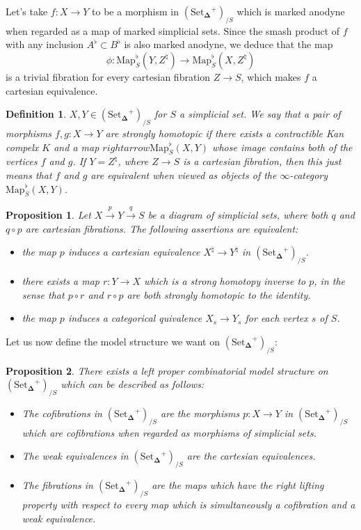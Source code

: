 \documentclass{amsart}
\newcommand{\8}{\ensuremath{\infty}}
\newcommand{\SSet}{\ensuremath{\text{Set}_{\boldsymbol{\Delta}}}}
\newcommand{\Map}{\ensuremath{\text{Map}}}
\newtheorem{definition}{Definition}
\newtheorem{proposition}{Proposition}
\begin{document}
Let's take $f:X\rightarrow Y$ to be a morphism in $(\SSet^+)_{/S}$ which is marked anodyne when regarded as a map of marked simplicial sets. Since the smash product of $f$ with any inclusion $A^\flat\subset B^\flat$ is also marked anodyne, we deduce that the map \[\phi:\Map_S^\flat(Y,Z^\natural)\rightarrow \Map_S^\flat(X,Z^\natural)\] is a trivial fibration for every cartesian fibration $Z\rightarrow S$, which makes $f$ a cartesian equivalence.

\begin{definition}
  $X,Y\in(\SSet^+)_{/S}$ for $S$ a simplicial set. We say that a pair of morphisms $f,g:X\rightarrow Y$ are strongly homotopic if there exists a contractible Kan compelx $K$ and a map $rightarrow \Map^\flat_S(X,Y)$ whose image contains both of the vertices $f$ and $g$. If $Y = Z^\natural$, where $Z\rightarrow S$ is a cartesian fibration, then this just means that $f$ and $g$ are equivalent when viewed as objects of the \8-category $\Map_S^\flat(X,Y)$.
\end{definition}

\begin{proposition}
  Let $X\xrightarrow{p} Y\xrightarrow{q} S$ be a diagram of simplicial sets, where both $q$ and $q\circ p$ are cartesian fibrations. The following assertions are equivalent:
  \begin{itemize}
    \item[(1)] the map $p$ induces a cartesian equivalence $X^\natural \rightarrow Y^\natural$ in $(\SSet^+)_{/S}$.
    \item[(2)] there exists a map $r:Y\rightarrow X$ which is a strong homotopy inverse to $p$, in the sense that $p\circ r$ and $r\circ p$ are both strongly homotopic to the identity.
    \item[(3)] the map $p$ induces a categorical quivalence $X_s\rightarrow Y_s$ for each vertex $s$ of $S$.  
  \end{itemize}
\end{proposition}

Let us now define the model structure we want on $(\SSet^+)_{/S}$:
\begin{proposition}
There exists a left proper combinatorial model structure on $(\SSet^+)_{/S}$ which can be described as follows:
\begin{itemize}
  \item[(C)] The cofibrations in $(\SSet^+)_{/S}$ are the morphisms $p:X\rightarrow Y$ in $(\SSet^+)_{/S}$ which are cofibrations when regarded as morphisms of simplicial sets.
  \item[(W)] The weak equivalences in $(\SSet^+)_{/S}$ are the cartesian equivalences.
  \item[(F)] The fibrations in $(\SSet^+)_{/S}$ are the maps which have the right lifting property with respect to every map which is simultaneously a cofibration and a weak equivalence.  
\end{itemize}
\end{proposition}
\end{document}
